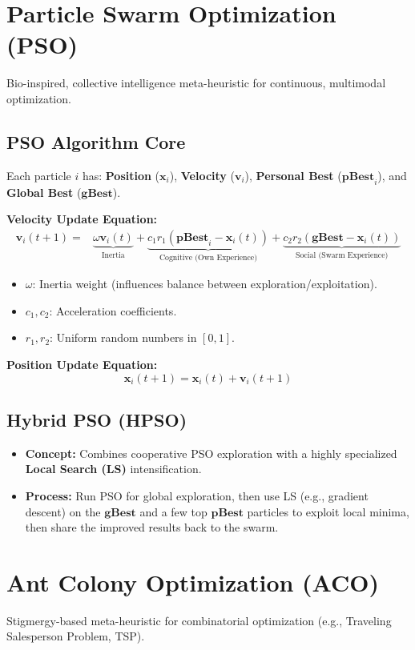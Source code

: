\documentclass{report}
\begin{document}
\section*{Particle Swarm Optimization (PSO)}
Bio-inspired, collective intelligence meta-heuristic for continuous, multimodal optimization.

\subsection*{PSO Algorithm Core}
Each particle $i$ has: \textbf{Position} ($\mathbf{x}_i$), \textbf{Velocity} ($\mathbf{v}_i$), \textbf{Personal Best} ($\mathbf{pBest}_i$), and \textbf{Global Best} ($\mathbf{gBest}$).

\textbf{Velocity Update Equation:}
\begin{align*}
\mathbf{v}_i(t+1) = & \underbrace{\omega \mathbf{v}_i(t)}_{\text{Inertia}} + \underbrace{c_1 r_1 (\mathbf{pBest}_i - \mathbf{x}_i(t))}_{\text{Cognitive (Own Experience)}} + \underbrace{c_2 r_2 (\mathbf{gBest} - \mathbf{x}_i(t))}_{\text{Social (Swarm Experience)}}
\end{align*}
\begin{itemize}
    \item $\omega$: Inertia weight (influences balance between exploration/exploitation).
    \item $c_1, c_2$: Acceleration coefficients.
    \item $r_1, r_2$: Uniform random numbers in $[0, 1]$.
\end{itemize}

\textbf{Position Update Equation:}
\[
\mathbf{x}_i(t+1) = \mathbf{x}_i(t) + \mathbf{v}_i(t+1)
\]

\subsection*{Hybrid PSO (HPSO)}
\begin{itemize}
    \item \textbf{Concept:} Combines cooperative PSO exploration with a highly specialized \textbf{Local Search (LS)} intensification.
    \item \textbf{Process:} Run PSO for global exploration, then use LS (e.g., gradient descent) on the $\mathbf{gBest}$ and a few top $\mathbf{pBest}$ particles to exploit local minima, then share the improved results back to the swarm.
\end{itemize}

\section*{Ant Colony Optimization (ACO)}
Stigmergy-based meta-heuristic for combinatorial optimization (e.g., Traveling Salesperson Problem, TSP).
\end{document}
